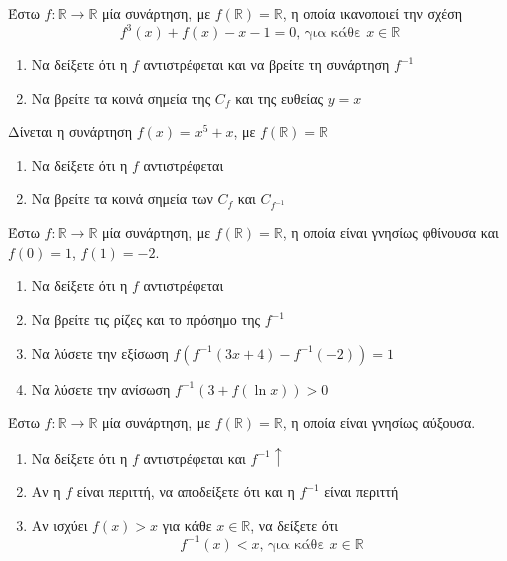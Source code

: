 \documentclass{presentation}
\begin{document}
\begin{askisi}
  Έστω $f:\mathbb{R}\to\mathbb{R}$ μία συνάρτηση, με $f(\mathbb{R})=\mathbb{R}$, η οποία ικανοποιεί την σχέση
  $$f^3(x)+f(x)-x-1=0\text{, για κάθε }x\in \mathbb{R}$$
  \begin{enumerate}
    \item Να δείξετε ότι η $f$ αντιστρέφεται και να βρείτε τη συνάρτηση $f^{-1}$ \pause
    \item Να βρείτε τα κοινά σημεία της $C_f$ και της ευθείας $y=x$
  \end{enumerate}
\end{askisi}

\begin{askisi}
  Δίνεται η συνάρτηση $f(x)=x^5+x$, με $f(\mathbb{R})=\mathbb{R}$
  \begin{enumerate}
    \item Να δείξετε ότι η $f$ αντιστρέφεται \pause
    \item Να βρείτε τα κοινά σημεία των $C_f$ και $C_{f^{-1}}$
  \end{enumerate}
\end{askisi}

\begin{askisi}
  Έστω $f:\mathbb{R}\to\mathbb{R}$ μία συνάρτηση, με $f(\mathbb{R})=\mathbb{R}$, η οποία είναι γνησίως φθίνουσα και $f(0)=1$, $f(1)=-2$.
  \begin{enumerate}
    \item Να δείξετε ότι η $f$ αντιστρέφεται \pause
    \item Να βρείτε τις ρίζες και το πρόσημο της $f^{-1}$ \pause
    \item Να λύσετε την εξίσωση $f\left(f^{-1}(3x+4)-f^{-1}(-2)\right)=1$ \pause
    \item Να λύσετε την ανίσωση $f^{-1}\left(3+f(\ln x)\right)>0$
  \end{enumerate}
\end{askisi}

\begin{askisi}
  Έστω $f:\mathbb{R}\to\mathbb{R}$ μία συνάρτηση, με $f(\mathbb{R})=\mathbb{R}$, η οποία είναι γνησίως αύξουσα.
  \begin{enumerate}
    \item Να δείξετε ότι η $f$ αντιστρέφεται και $f^{-1}\uparrow$\pause
    \item Αν η $f$ είναι περιττή, να αποδείξετε ότι και η $f^{-1}$ είναι περιττή \pause
    \item Αν ισχύει $f(x)>x$ για κάθε $x\in\mathbb{R}$, να δείξετε ότι
          $$f^{-1}(x)<x\text{, για κάθε }x\in\mathbb{R}$$
  \end{enumerate}
\end{askisi}
\end{document}
